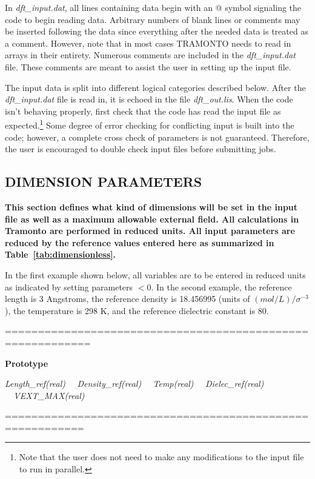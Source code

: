 \documentclass[10pt,onecolumn]{article}
\begin{document}
In {\it dft\_input.dat}, all lines containing data
begin with an @ symbol signaling the code to begin
reading data.  Arbitrary numbers of blank lines or comments may be inserted following the data since
everything after the needed data is treated as a comment.  However, note that in most cases
TRAMONTO needs to read in arrays in their entirety.
Numerous comments are included in the {\it
dft\_input.dat}
file.  These comments are meant to assist the user in setting up the
input file.

The input data is split into different logical categories
described below. After the {\it dft\_input.dat}
file is read in, it is echoed in the file {\it dft\_out.lis}.  When the code isn't behaving
properly, first check that the code has read the input file as expected.\footnote{ Note that the user does not need to make any modifications to the input file to run in parallel.}
Some degree of error checking for conflicting input is built into the code;  however, a complete cross check of parameters is not guaranteed.  Therefore, the user is encouraged to double check input files before submitting jobs.


\vfill
\break


\subsection{DIMENSION PARAMETERS}
{\bf
This section defines what kind of dimensions will be set in the input file as well
as a maximum allowable external field.
All calculations in Tramonto are performed in reduced units.  All input parameters are reduced
by the reference values entered here as summarized in Table~\ref{tab:dimensionless}.  

In the first example shown below, all variables are to be entered in
reduced units as indicated by setting parameters $<0$.
In the second example, the reference
length is 3 Angstroms, the  reference density
is 18.456995 (units of $(mol/L)/\sigma^{-3}$), 
the temperature is 298 K, and
the reference dielectric constant is 80.
}

\vspace{0.1in}
\noindent===========================================================

{\bf Prototype}

{\it Length\_ref(real) \ \  Density\_ref(real) \ \  Temp(real) \ \  Dielec\_ref(real) \ \   VEXT\_MAX(real) }

\noindent==========================================================
\end{document}
